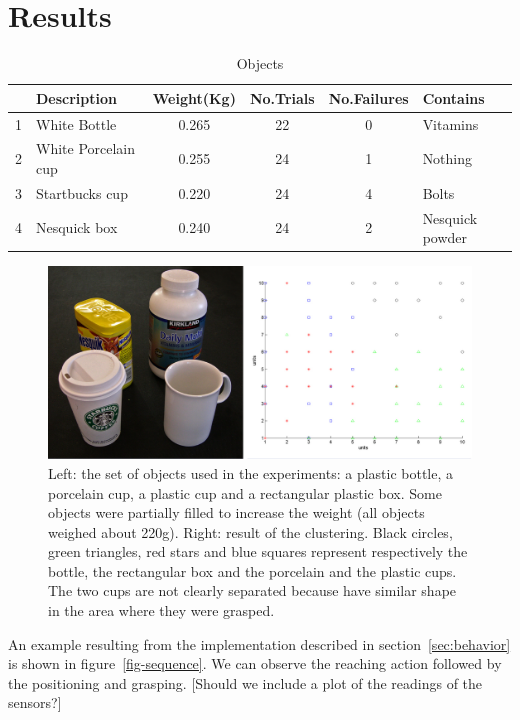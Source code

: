 \section{Results}
\label{sec-results}

\begin{table}[tb]
  \caption{Objects} \label{tab:objects} \centering
  \begin{tabular}{|c|l|c|c|c|l|}
    \hline
    &Description& Weight(Kg)&No.Trials&No.Failures&Contains \\
    \hline
    1&White Bottle        & 0.265 & 22& 0 & Vitamins\\
    2&White Porcelain cup & 0.255 & 24& 1 & Nothing\\
    3&Startbucks cup      & 0.220 & 24& 4 & Bolts \\
    4&Nesquick box        & 0.240 & 24& 2 & Nesquick powder\\

    \hline
  \end{tabular}
\end{table}

\begin{figure}[tb]
\centerline{
\includegraphics[width=6.0in]{./figures/objects-clusters.eps}
}\caption{Left: the set of objects used in the experiments: a plastic bottle, 
a porcelain cup, a plastic cup and a rectangular plastic box. Some objects were 
partially filled to increase the weight (all objects weighed about 220g). 
Right: result of the clustering. Black circles, green 
triangles, red stars and blue squares represent respectively the bottle, 
the rectangular box and the porcelain and the plastic cups. The two cups are not 
clearly separated because have similar shape in the area where they were grasped.}
\label{fig:Objects}
\end{figure}

An example resulting from the implementation described in
section~\ref{sec:behavior} is shown in figure~\ref{fig-sequence}.
We can observe the reaching action followed by the positioning and
grasping. [Should we include a plot of the readings of the
sensors?]

